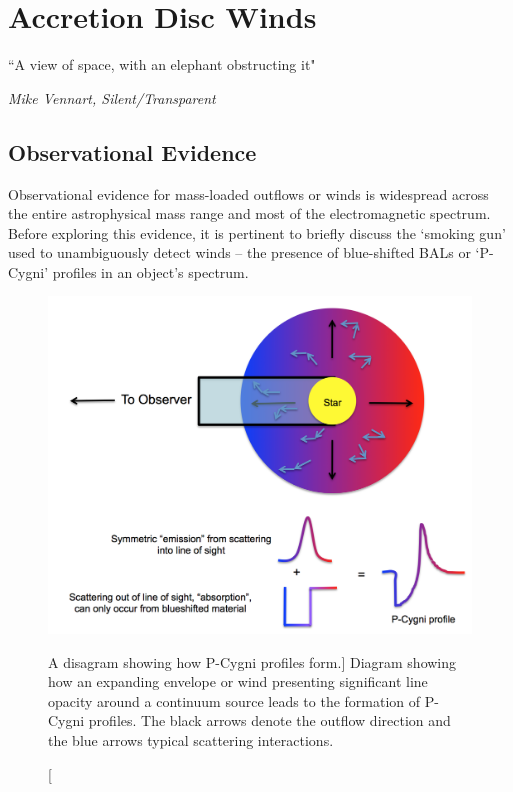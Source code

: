 \chapter{Accretion Disc Winds}
\label{sec:winds}

\epigraph{``A view of space, with an elephant obstructing it"}
{{\sl Mike Vennart, Silent/Transparent}}


\section{Observational Evidence}

Observational evidence for mass-loaded outflows or winds is 
widespread across the entire astrophysical mass range and most of
the electromagnetic spectrum. Before exploring this evidence, 
it is pertinent to briefly discuss the `smoking gun'
used to unambiguously detect winds -- the presence of blue-shifted BALs
or `P-Cygni' profiles in an object's spectrum. 

\begin{figure}
\centering
\includegraphics[width=1.0\textwidth]{figures/02-outflows/pcyg.png}
\caption
[A disagram showing how P-Cygni profiles form.]
{
Diagram showing how an expanding envelope or wind presenting significant line
opacity around a continuum source leads to the formation of P-Cygni profiles.
The black arrows denote the outflow direction and the blue arrows typical
scattering interactions.
} 
\label{fig:pcyg}
\end{figure}

